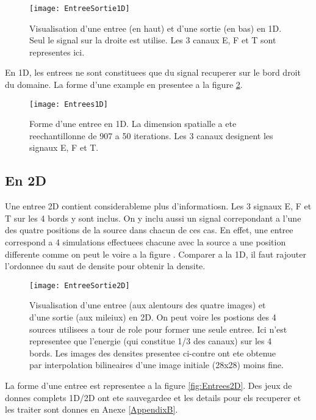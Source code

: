\begin{figure}[!h]
\centering
\texttt{[image: EntreeSortie1D]} 
\decoRule
\caption[EntreeSortie1D]{Visualisation d'une entree (en haut) et d'une sortie (en bas) en 1D. Seul le signal sur la droite est utilise. Les 3 canaux E, F et T sont representes ici.}
\label{fig:EntreeSortie1D}
\end{figure}

En 1D, les entrees ne sont constituees que du signal recuperer sur le bord droit du domaine. La forme d'une example en presentee a la figure \ref{fig:Entrees1D}.

\begin{figure}[!h]
\centering
\texttt{[image: Entrees1D]} 
\decoRule
\caption[Entrees1D]{Forme d'une entree en 1D. La dimension spatialle a ete reechantillonne de 907 a 50 iterations. Les 3 canaux designent les signaux E, F et T.}
\label{fig:Entrees1D}
\end{figure}

\subsection{En 2D}
Une entree 2D contient considerableme plus d'informatiosn. Les 3 signaux E, F et T sur les 4 bords y sont inclus. On y inclu aussi un signal correpondant a l'une des quatre positions de la source dans chacun de ces cas. En effet, une entree correspond a 4 simulations effectuees chacune avec la source a une position differente comme on peut le voire a la figure . Comparer a la 1D, il faut rajouter l'ordonnee du saut de densite pour obtenir la densite.

\begin{figure}[!h]
\centering
\texttt{[image: EntreeSortie2D]} 
\decoRule
\caption[EntreeSortie2D]{Visualisation d'une entree (aux alentours des quatre images) et d'une sortie (aux mileiux) en 2D. On peut voire les postions des 4 sources utilisees a tour de role pour former une seule entree. Ici n'est representee que l'energie (qui constitue 1/3 des canaux) sur les 4 bords. Les images des densites presentee ci-contre ont ete obtenue par interpolation bilineaires d'une image initiale (28x28) moins fine.}
\label{fig:EntreeSortie2D}
\end{figure}


La forme d'une entree est representee a la figure \ref{fig:Entrees2D}. Des jeux de donnes complets 1D/2D ont ete sauvegardee et les details pour els recuperer et les traiter sont donnes en Anexe \ref{AppendixB}.

